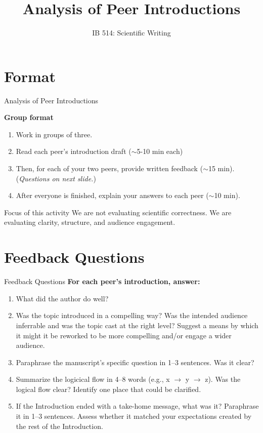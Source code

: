\documentclass{beamer}
\title{Analysis of Peer Introductions}
\author[]{IB 514: Scientific Writing}
\date[]{}
\begin{document}
\begin{frame}
  \titlepage
\end{frame}


\section{Format}
\begin{frame}{Analysis of Peer Introductions}

  \textbf{Group format}
  \begin{enumerate}
    \item Work in groups of three.
    \item Read each peer's introduction draft ($\sim$5-10 min each)
    \item Then, for each of your two peers, provide written feedback ($\sim$15 min). (\textit{Questions on next slide.})
    \item After everyone is finished, explain your answers to each peer ($\sim$10 min).
  \end{enumerate}

    \begin{block}{Focus of this activity}
    We are not evaluating scientific correctness.
    We are evaluating clarity, structure, and audience engagement.
  \end{block}

\end{frame}

\section{Feedback Questions}
\begin{frame}{Feedback Questions}
  \small
  \textbf{For each peer's introduction, answer:}
  \begin{enumerate}
    \item What did the author do well?
    \item Was the topic introduced in a compelling way?  Was the intended audience inferrable and was the topic cast at the right level?  Suggest a means by which it might it be reworked to be more compelling and/or engage a wider audience.
    \item Paraphrase the manuscript's specific question in 1--3 sentences. Was it clear?
    \item Summarize the logicical flow in 4--8 words
      (e.g., x $\rightarrow$ y $\rightarrow$ z). Was the logical flow clear? Identify one place that could be clarified.
    \item If the Introduction ended with a take-home message, what was it? Paraphrase it in 1--3 sentences.  Assess whether it matched your expectations created by the rest of the Introduction.
  \end{enumerate}

\end{frame}
\end{document}
